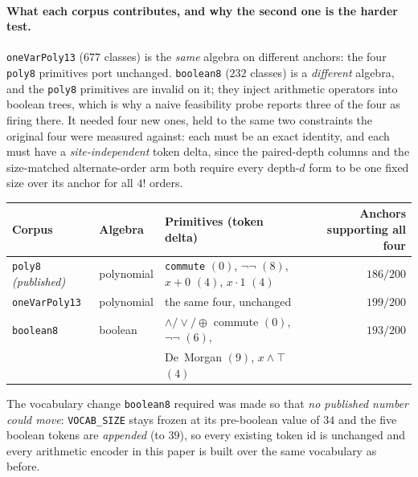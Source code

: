 \paragraph{What each corpus contributes, and why the second one is the harder test.} \texttt{oneVarPoly13} ($677$ classes) is the \emph{same} algebra on different anchors: the four \texttt{poly8} primitives port unchanged. \texttt{boolean8} ($232$ classes) is a \emph{different} algebra, and the \texttt{poly8} primitives are invalid on it; they inject arithmetic operators into boolean trees, which is why a naive feasibility probe reports three of the four as firing there. It needed four new ones, held to the same two constraints the original four were measured against: each must be an exact identity, and each must have a \emph{site-independent} token delta, since the paired-depth columns and the size-matched alternate-order arm both require every depth-$d$ form to be one fixed size over its anchor for all $4!$ orders.

\begin{center}
\footnotesize
\setlength{\tabcolsep}{4pt}
\begin{tabular}{@{}l l l r@{}}
\toprule
Corpus & Algebra & Primitives (token delta) & Anchors supporting all four \\
\midrule
\texttt{poly8} \emph{(published)} & polynomial & \texttt{commute} $(0)$, $\neg\neg$ $(8)$, $x{+}0$ $(4)$, $x{\cdot}1$ $(4)$ & $186/200$ \\
\texttt{oneVarPoly13} & polynomial & the same four, unchanged & $199/200$ \\
\texttt{boolean8} & boolean & $\wedge/\vee/\oplus$ commute $(0)$, $\neg\neg$ $(6)$, & $193/200$ \\
 & & De~Morgan $(9)$, $x{\wedge}\top$ $(4)$ & \\
\bottomrule
\end{tabular}
\end{center}

\noindent The vocabulary change \texttt{boolean8} required was made so that \emph{no published number could move}: \texttt{VOCAB\_SIZE} stays frozen at its pre-boolean value of $34$ and the five boolean tokens are \emph{appended} (to $39$), so every existing token id is unchanged and every arithmetic encoder in this paper is built over the same vocabulary as before.

